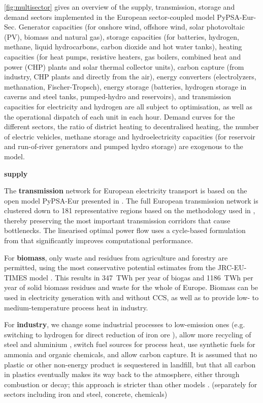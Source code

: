 \cref{fig:multisector} gives an overview of the supply, transmission, storage
and demand sectors implemented in the European sector-coupled model
PyPSA-Eur-Sec. Generator capacities (for onshore wind, offshore wind, solar
photovoltaic (PV), biomass and natural gas), storage capacities (for batteries,
hydrogen, methane, liquid hydrocarbons, carbon dioxide and hot water tanks),
heating capacities (for heat pumps, resistive heaters, gas boilers, combined
heat and power (CHP) plants and solar thermal collector units), carbon capture
(from industry, CHP plants and directly from the air), energy converters
(electrolyzers, methanation, Fischer-Tropsch), energy storage (batteries,
hydrogen storage in caverns and steel tanks, pumped-hydro and reservoirs), and
transmission capacities for electricity and hydrogen are all subject to
optimisation, as well as the operational dispatch of each unit in each hour.
Demand curves for the different sectors, the ratio of district heating to
decentralised heating, the number of electric vehicles, methane storage and
hydroelectricity capacities (for reservoir and run-of-river generators and
pumped hydro storage) are exogenous to the model.

\textbf{supply}

The \textbf{transmission} network for European electricity transport is based on
the open model PyPSA-Eur presented in \cite{horschPyPSAEurOpen2018}. The full
European transmission network is clustered down to 181 representative regions
based on the methodology used in \cite{Hoersch2017,frysztackiStrongEffect2021},
thereby preserving the most important transmission corridors that cause
bottlenecks. The linearised optimal power flow uses a cycle-based formulation
from \cite{horschLinearOptimal2018} that significantly improves computational
performance.

For \textbf{biomass}, only waste and residues from agriculture and forestry are
permitted, using the most conservative potential estimates from the JRC-EU-TIMES
model \cite{jrcbiomass2015}. This results in 347~TWh per year of biogas and
1186~TWh per year of solid biomass residues and waste for the whole of Europe.
Biomass can be used in electricity generation with and
without CCS, as well as to provide low- to medium-temperature process heat in
industry.

For \textbf{industry}, we change some industrial processes to low-emission ones (e.g.
switching to hydrogen for direct reduction of iron ore \cite{voglAssessmentHydrogen2018}), allow
more recycling of steel and aluminium \cite{circular_economy}, switch fuel
sources for process heat, use synthetic fuels for ammonia and organic chemicals,
and allow carbon capture. It is assumed that no plastic or other non-energy
product is sequestered in landfill, but that all carbon in plastics eventually
makes its way back to the atmosphere, either through combustion or decay; this
approach is stricter than other models \cite{in-depth_2018}.
(separately for sectors including iron and steel, concrete, chemicals)

